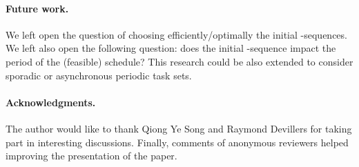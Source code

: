 \documentclass{article}
\begin{document}
\paragraph{Future work.} We left open the question of choosing efficiently/optimally the initial -sequences. We left also open the following question: does the initial -sequence impact the period of the (feasible) schedule? This research could be also extended to consider sporadic or asynchronous periodic task sets.

\paragraph{Acknowledgments.} The author would like to thank \mbox{Qiong} Ye \mbox{Song} and \mbox{Raymond} \mbox{Devillers} for taking part in interesting discussions. Finally, comments of anonymous reviewers helped improving the presentation of the paper.



\end{document}
